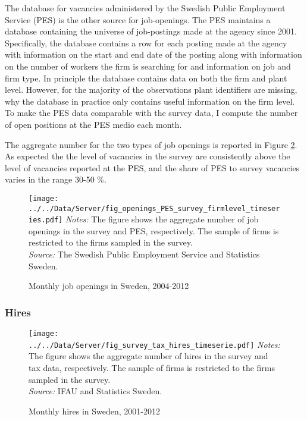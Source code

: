 The database for vacancies administered by the Swedish Public Employment Service (PES) is the other source for job-openings. The PES maintains a database containing the universe of job-postings made at the agency since 2001. Specifically, the database contains a row for each posting made at the agency with information on the start and end date of the posting along with information on the number of workers the firm is searching for and information on job and firm type. In principle the database contains data on both the firm and plant level. However, for the majority of the observations plant identifiers are missing, why the database in practice 
only contains useful information on the firm level. To make the PES data comparable with the survey data, I compute the number of open positions at the PES medio each month. 

The aggregate number for the two types of job openings is reported in Figure \ref{fig:openings_timeserie}. As expected the the level of vacancies in the survey are consistently above the level of vacancies reported at the PES, and the share of PES to survey vacancies varies in the range 30-50 \%. 

\begin{figure}[t]
\centering
\caption{Monthly job openings in Sweden, 2004-2012}
\texttt{[image: ../../Data/Server/fig\_openings\_PES\_survey\_firmlevel\_timeseries.pdf]}
\flushleft
\footnotesize{\emph{Notes:} The figure shows the aggregate number of job openings in the survey and PES, respectively. The sample of firms is restricted to the firms sampled in the survey.} \\
\footnotesize{\emph{Source:} The Swedish Public Employment Service and Statistics Sweden.}
\label{fig:openings_timeserie}
\end{figure}

\subsubsection{Hires}

\begin{figure}[t]
\centering
\caption{Monthly hires in Sweden, 2001-2012}
\texttt{[image: ../../Data/Server/fig\_survey\_tax\_hires\_timeserie.pdf]}
\flushleft
\footnotesize{\emph{Notes:} The figure shows the aggregate number of hires in the survey and tax data, respectively. The sample of firms is restricted to the firms sampled in the survey.} \\
\footnotesize{\emph{Source:} IFAU and Statistics Sweden.}
\label{fig:openings_timeserie}
\end{figure}

